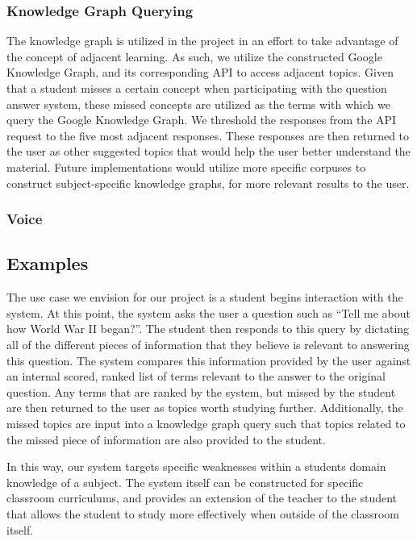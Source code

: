 \documentclass[11pt,a4paper]{article}
\begin{document}
\subsubsection{Knowledge Graph Querying} 
The knowledge graph is utilized in the project in an effort to take advantage of the concept of adjacent learning. As such, we utilize the constructed Google Knowledge Graph, and its corresponding API to access adjacent topics. Given that a student misses a certain concept when participating with the question answer system, these missed concepts are utilized as the terms with which we query the Google Knowledge Graph. We threshold the responses from the API request to the five most adjacent responses. These responses are then returned to the user as other suggested topics that would help the user better understand the material. Future implementations would utilize more specific corpuses to construct subject-specific knowledge graphs, for more relevant results to the user.

\subsubsection{Voice}


\subsection{Examples}
The use case we envision for our project is a student begins interaction with the system. At this point, the system asks the user a question such as “Tell me about how World War II began?”. The student then responds to this query by dictating all of the different pieces of information that they believe is relevant to answering this question. The system compares this information provided by the user against an internal scored, ranked list of terms relevant to the answer to the original question. Any terms that are ranked by the system, but missed by the student are then returned to the user as topics worth studying further. Additionally, the missed topics are input into a  knowledge graph query such that topics related to the missed piece of information are also provided to the student.

In this way, our system targets specific weaknesses within a students domain knowledge of a subject. The system itself can be constructed for specific classroom curriculums, and provides an extension of the teacher to the student that allows the student to study more effectively when outside of the classroom itself.  
\end{document}
